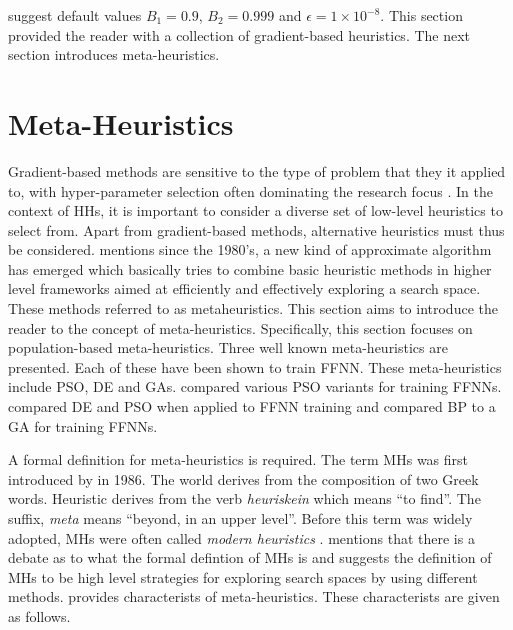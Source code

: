 \citeauthor{ref:kingma:2014} \cite{ref:kingma:2014} suggest default values $B_{1}=0.9$, $B_{2}=0.999$ and $\epsilon = 1 \times 10^{-8}$. This section provided the reader with a collection of gradient-based heuristics. The next section introduces meta-heuristics.

\section{Meta-Heuristics}
\label{sec:heuristics:mh}

Gradient-based methods are sensitive to the type of problem that they it applied to, with hyper-parameter selection often dominating the research focus \cite{ref:bengio:2000}\cite{ref:feurer:2019}. In the context of \acp{HH}, it is important to consider a diverse set of low-level heuristics to select from. Apart from gradient-based methods, alternative heuristics must thus be considered. \cite{ref:blum:2003} mentions since the 1980's, a new kind of approximate algorithm has emerged which basically tries to combine basic heuristic methods in higher level frameworks aimed at efficiently and effectively exploring a search space. These methods referred to as metaheuristics. This section aims to introduce the reader to the concept of meta-heuristics. Specifically, this section focuses on population-based meta-heuristics. Three well known meta-heuristics are presented. Each of these have been shown to train \ac{FFNN}. These meta-heuristics include \ac{PSO}, \ac{DE} and \acp{GA}. \cite{ref:carvalho:2006} compared various \ac{PSO} variants for training \acp{FFNN}. \cite{ref:espinal:2011} compared \ac{DE} and \ac{PSO} when applied to \ac{FFNN} training and \cite{ref:gupta:1999} compared \ac{BP} to a \ac{GA} for training \acp{FFNN}.

A formal definition for meta-heuristics is required. The term \aclp{MH} was first introduced by \citeauthor{ref:glover:1986}\cite{ref:glover:1986} in 1986. The world derives from the composition of two Greek words. Heuristic derives from the verb \textit{heuriskein} which means ``to find''. The suffix, \textit{meta} means ``beyond, in an upper level''. Before this term was widely adopted, \acp{MH} were often called \textit{modern heuristics} \cite{ref:reeves:1993}. \cite{ref:blum:2003} mentions that there is a debate as to what the formal defintion of \acp{MH} is and suggests the definition of \acp{MH} to be high level strategies for exploring search spaces by using different methods. \citeauthor{ref:blum:2003} \cite{ref:blum:2003} provides characterists of meta-heuristics. These characterists are given as follows.

